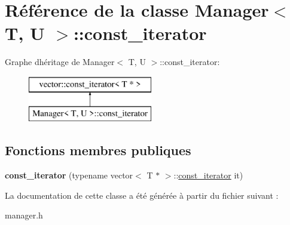 \hypertarget{class_manager_1_1const__iterator}{}\section{Référence de la classe Manager$<$ T, U $>$\+:\+:const\+\_\+iterator}
\label{class_manager_1_1const__iterator}
Graphe d\textquotesingle{}héritage de Manager$<$ T, U $>$\+:\+:const\+\_\+iterator\+:\begin{figure}[H]
\begin{center}
\leavevmode
\includegraphics[height=2.000000cm]{class_manager_1_1const__iterator}
\end{center}
\end{figure}
\subsection*{Fonctions membres publiques}
\begin{DoxyCompactItemize}
\item 
\hypertarget{class_manager_1_1const__iterator_a0b291f291404f06dac59623886f02424}{}{\bfseries const\+\_\+iterator} (typename vector$<$ T $\ast$ $>$\+::\hyperlink{class_manager_1_1const__iterator}{const\+\_\+iterator} it)\label{class_manager_1_1const__iterator_a0b291f291404f06dac59623886f02424}

\end{DoxyCompactItemize}


La documentation de cette classe a été générée à partir du fichier suivant \+:\begin{DoxyCompactItemize}
\item 
manager.\+h\end{DoxyCompactItemize}
